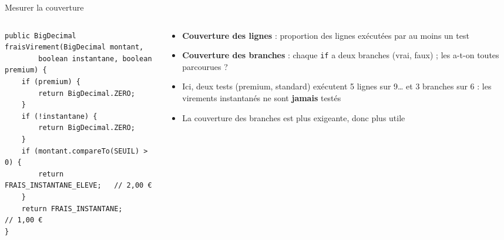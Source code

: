 \documentclass[aspectratio=169,10pt]{beamer}
\begin{document}
\begin{frame}[fragile]{Mesurer la couverture}
  \begin{columns}[T]
    \begin{column}{0.5\textwidth}
\begin{lstlisting}[basicstyle=\lstcode\scriptsize]
public BigDecimal fraisVirement(BigDecimal montant,
        boolean instantane, boolean premium) {
    if (premium) {
        return BigDecimal.ZERO;
    }
    if (!instantane) {
        return BigDecimal.ZERO;
    }
    if (montant.compareTo(SEUIL) > 0) {
        return FRAIS_INSTANTANE_ELEVE;   // 2,00 €
    }
    return FRAIS_INSTANTANE;             // 1,00 €
}
\end{lstlisting}
    \end{column}
    \begin{column}{0.46\textwidth}
      \small
      \begin{itemize}
        \item \textbf{Couverture des lignes} : proportion des lignes exécutées par au moins un test
        \item \textbf{Couverture des branches} : chaque \texttt{if} a deux branches (vrai, faux) ; les a-t-on toutes parcourues ?
        \item Ici, deux tests (premium, standard) exécutent 5 lignes sur 9\ldots{} et 3 branches sur 6 : les virements instantanés ne sont \textbf{jamais} testés
        \item La couverture des branches est plus exigeante, donc plus utile
      \end{itemize}
    \end{column}
  \end{columns}
\end{frame}
\end{document}
